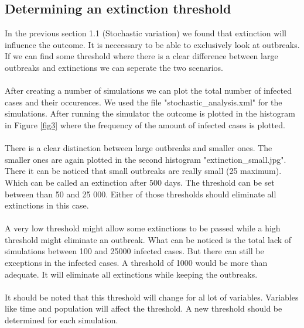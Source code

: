 \documentclass[runningheads]{llncs}
\begin{document}
\subsection{Determining an extinction threshold}
In the previous section 1.1 (Stochastic variation) we found that extinction will influence the outcome. It is neccessary to be able to exclusively look at outbreaks. If we can find some threshold where there is a clear difference between large outbreaks and extinctions we can seperate the two scenarios.\\ \\
After creating a number of simulations we can plot the total number of infected cases and their occurences.  We used the file "stochastic\_analysis.xml" for the simulations. After running the simulator the outcome is plotted in the histogram in Figure \ref{fig3} where the frequency of the amount of infected cases is plotted.\\ \\
There is a clear distinction between large outbreaks and smaller ones. The smaller ones are again plotted in the second histogram "extinction\_small.jpg". There it can be noticed that small outbreaks are really small (25 maximum). Which can be called an extinction after 500 days. The threshold can be set between than 50 and 25 000. Either of those thresholds should eliminate all extinctions in this case.\\ \\
A very low threshold might allow some extinctions to be passed while a high threshold might eliminate an outbreak. What can be noticed is the total lack of simulations between 100 and 25000 infected cases. But there can still be exceptions in the infected cases. A threshold of 1000 would be more than adequate. It will eliminate all extinctions while keeping the outbreaks.\\ \\
It should be noted that this threshold will change for al lot of variables. Variables like time and population will affect the threshold. A new threshold should be determined for each simulation.
\end{document}
